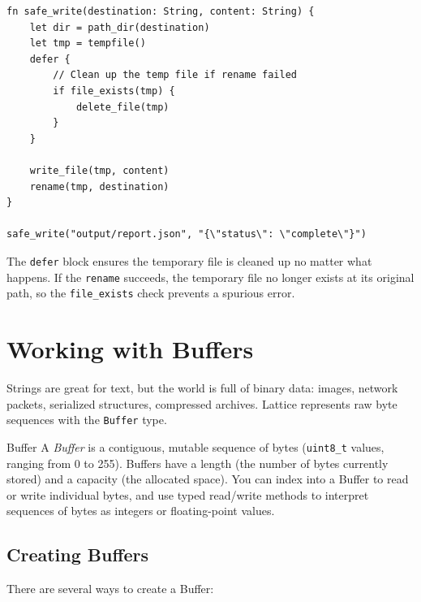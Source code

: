\begin{lstlisting}[language=Lattice, caption={Atomic file writes with tempfile and rename}]
fn safe_write(destination: String, content: String) {
    let dir = path_dir(destination)
    let tmp = tempfile()
    defer {
        // Clean up the temp file if rename failed
        if file_exists(tmp) {
            delete_file(tmp)
        }
    }

    write_file(tmp, content)
    rename(tmp, destination)
}

safe_write("output/report.json", "{\"status\": \"complete\"}")
\end{lstlisting}

The \lstinline|defer| block ensures the temporary file is cleaned up no
matter what happens. If the \lstinline|rename| succeeds, the temporary file
no longer exists at its original path, so the \lstinline|file_exists| check
prevents a spurious error.

\section{Working with Buffers}\label{sec:buffers}


Strings are great for text, but the world is full of binary data: images,
network packets, serialized structures, compressed archives. Lattice
represents raw byte sequences with the \lstinline|Buffer| type.

\begin{defnbox}{Buffer}
A \emph{Buffer} is a contiguous, mutable sequence of bytes (\texttt{uint8\_t}
values, ranging from 0 to 255). Buffers have a length (the number of bytes
currently stored) and a capacity (the allocated space). You can index into a
Buffer to read or write individual bytes, and use typed read/write methods to
interpret sequences of bytes as integers or floating-point values.
\end{defnbox}

\subsection{Creating Buffers}\label{sec:buffer-create}

There are several ways to create a Buffer:

